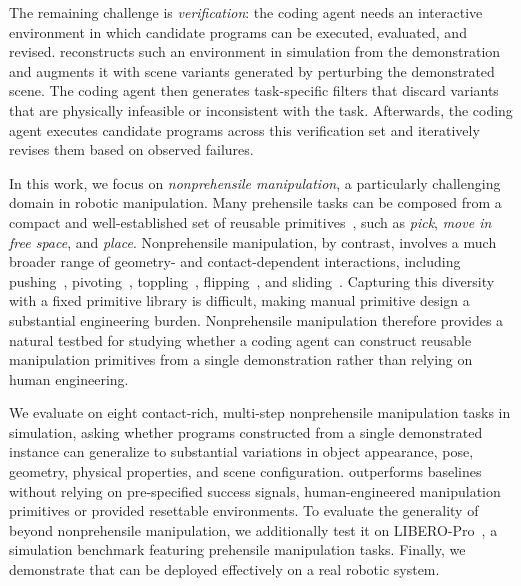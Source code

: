 The remaining challenge is \textit{verification}: the coding agent needs an interactive environment in which candidate programs can be executed, evaluated, and revised. \ours reconstructs such an environment in simulation from the demonstration and augments it with scene variants generated by perturbing the demonstrated scene. The coding agent then generates task-specific filters that discard variants that are physically infeasible or inconsistent with the task. Afterwards, the coding agent executes candidate programs across this verification set and iteratively revises them based on observed failures. 

In this work, we focus on \textit{nonprehensile manipulation}, a particularly challenging domain in robotic manipulation. Many prehensile tasks can be composed from a compact and well-established set of reusable primitives~\cite{garrett2021integrated}, such as \textit{pick}, \textit{move in free space}, and \textit{place}. Nonprehensile manipulation, by contrast, involves a much broader range of geometry- and contact-dependent interactions, including pushing~\cite{mason2001mechanics}, pivoting~\cite{holladay2015general}, toppling~\cite{cheng2021contact}, flipping~\cite{odhner2013open}, and sliding~\cite{cheng2022contact}. Capturing this diversity with a fixed primitive library is difficult, making manual primitive design a substantial engineering burden. Nonprehensile manipulation therefore provides a natural testbed for studying whether a coding agent can construct reusable manipulation primitives from a single demonstration rather than relying on human engineering.

We evaluate \ours on eight contact-rich, multi-step nonprehensile manipulation tasks in simulation, asking whether programs constructed from a single demonstrated instance can generalize to substantial variations in object appearance, pose, geometry, physical properties, and scene configuration. \ours outperforms baselines without relying on pre-specified success signals, human-engineered manipulation primitives or provided resettable environments. To evaluate the generality of \ours beyond nonprehensile manipulation, we additionally test it on LIBERO-Pro~\cite{zhou2025libero}, a simulation benchmark featuring prehensile manipulation tasks. Finally, we demonstrate that \ours can be deployed effectively on a real robotic system.